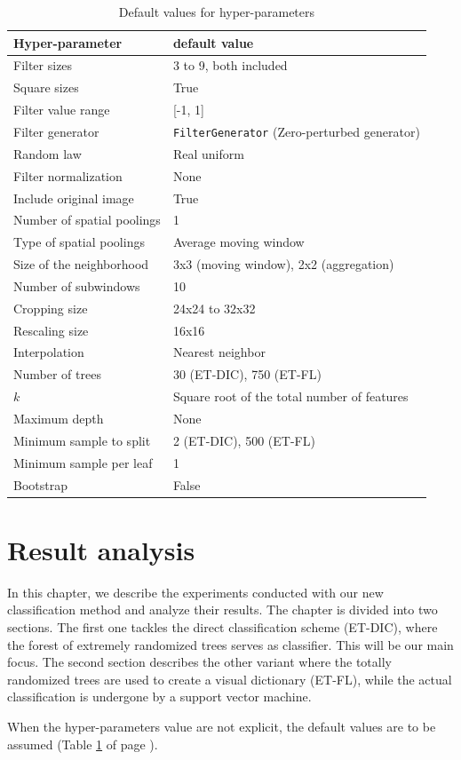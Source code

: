 \documentclass[a4paper]{report}
\begin{document}
	\begin{table}
		\centering
			\begin{tabular}{l|l}
			\hline
			Hyper-parameter & default value \\
			\hline
			Filter sizes & 3 to 9, both included\\
			Square sizes & True \\
			Filter value range & [-1, 1] \\
			Filter generator & \texttt{FilterGenerator} (Zero-perturbed generator)\\
			Random law & Real uniform\\
			Filter normalization & None\\
			Include original image & True\\
			Number of spatial poolings & 1 \\
			Type of spatial poolings & Average moving window \\
			Size of the neighborhood & 3x3 (moving window), 2x2 (aggregation)\\
			Number of subwindows & 10 \\
			Cropping size & 24x24 to 32x32 \\
			Rescaling size & 16x16 \\
			Interpolation & Nearest neighbor \\
			Number of trees & 30 (ET-DIC), 750 (ET-FL) \\
			$k$ & Square root of the total number of features \\
			Maximum depth & None \\
			Minimum sample to split & 2 (ET-DIC), 500 (ET-FL) \\
			Minimum sample per leaf & 1 \\
			Bootstrap & False \\
			\hline
			\end{tabular}
		\caption{Default values for hyper-parameters}
		\label{tab:DefaultValuesForHyperParameters}
	\end{table}
		


\chapter{\label{chap:results}Result analysis}
In this chapter, we describe the experiments conducted with our new classification method and analyze their results. The chapter is divided into two sections. The first one tackles the direct classification scheme (ET-DIC), where the forest of extremely randomized trees serves as classifier. This will be our main focus. The second section describes the other variant where the totally randomized trees are used to create a visual dictionary (ET-FL), while the actual classification is undergone by a support vector machine.
\par
When the hyper-parameters value are not explicit, the default values are to be assumed (Table \ref{tab:DefaultValuesForHyperParameters} of page \pageref{tab:DefaultValuesForHyperParameters}).
\end{document}
